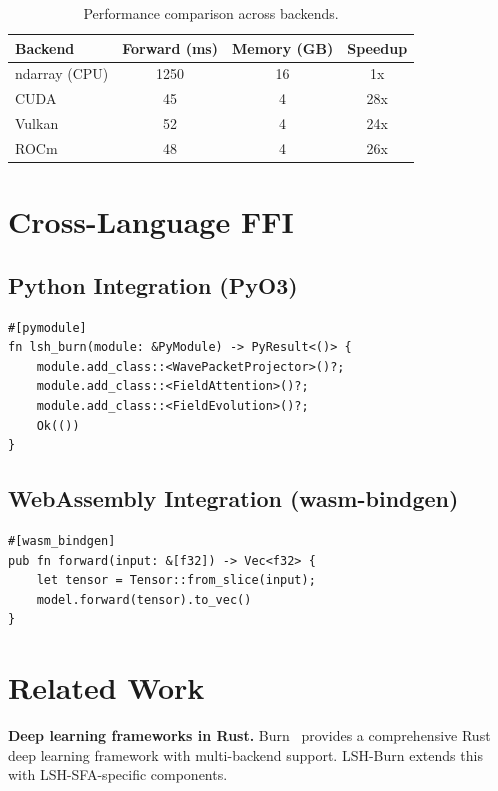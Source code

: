 \documentclass{article}
\begin{document}
\begin{table}[h]
\centering
\caption{Performance comparison across backends.}
\label{tab:perf}
\begin{tabular}{lccc}
\toprule
\textbf{Backend} & \textbf{Forward (ms)} & \textbf{Memory (GB)} & \textbf{Speedup} \\
\midrule
ndarray (CPU) & 1250 & 16 & 1x \\
CUDA & 45 & 4 & 28x \\
Vulkan & 52 & 4 & 24x \\
ROCm & 48 & 4 & 26x \\
\bottomrule
\end{tabular}
\end{table}

\section{Cross-Language FFI}

\subsection{Python Integration (PyO3)}

\begin{verbatim}
#[pymodule]
fn lsh_burn(module: &PyModule) -> PyResult<()> {
    module.add_class::<WavePacketProjector>()?;
    module.add_class::<FieldAttention>()?;
    module.add_class::<FieldEvolution>()?;
    Ok(())
}
\end{verbatim}

\subsection{WebAssembly Integration (wasm-bindgen)}

\begin{verbatim}
#[wasm_bindgen]
pub fn forward(input: &[f32]) -> Vec<f32> {
    let tensor = Tensor::from_slice(input);
    model.forward(tensor).to_vec()
}
\end{verbatim}

\section{Related Work}

\textbf{Deep learning frameworks in Rust.} Burn~\citep{burn2024} provides a comprehensive Rust deep learning framework with multi-backend support. LSH-Burn extends this with LSH-SFA-specific components.
\end{document}
